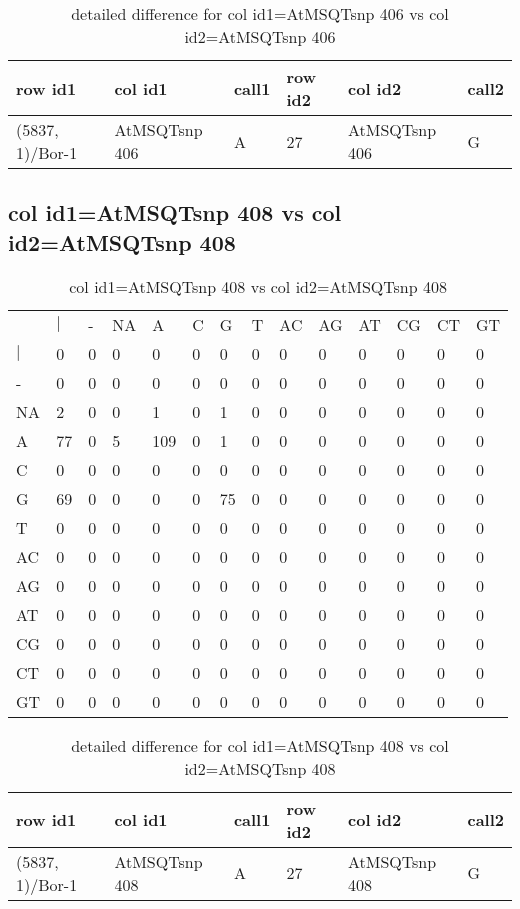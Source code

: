 \begin{center}
\begin{longtable}{|l|l|l|l|l|l|}
\caption{detailed difference for col id1=AtMSQTsnp 406 vs col id2=AtMSQTsnp 406} \label{table_dm917}\\
\hline
row id1&col id1&call1&row id2&col id2&call2\\
\hline
(5837, 1)/Bor-1&AtMSQTsnp 406&A&27&AtMSQTsnp 406&G\\
\hline
\end{longtable}
\end{center}

\subsection{col id1=AtMSQTsnp 408 vs col id2=AtMSQTsnp 408}
\begin{center}
\begin{longtable}{|l|l|l|l|l|l|l|l|l|l|l|l|l|l|}
\caption{col id1=AtMSQTsnp 408 vs col id2=AtMSQTsnp 408} \label{table_dm918}\\
\hline
\\
\hline
&$|$&-&NA&A&C&G&T&AC&AG&AT&CG&CT&GT\\
$|$&0&0&0&0&0&0&0&0&0&0&0&0&0\\
-&0&0&0&0&0&0&0&0&0&0&0&0&0\\
NA&2&0&0&1&0&1&0&0&0&0&0&0&0\\
A&77&0&5&109&0&1&0&0&0&0&0&0&0\\
C&0&0&0&0&0&0&0&0&0&0&0&0&0\\
G&69&0&0&0&0&75&0&0&0&0&0&0&0\\
T&0&0&0&0&0&0&0&0&0&0&0&0&0\\
AC&0&0&0&0&0&0&0&0&0&0&0&0&0\\
AG&0&0&0&0&0&0&0&0&0&0&0&0&0\\
AT&0&0&0&0&0&0&0&0&0&0&0&0&0\\
CG&0&0&0&0&0&0&0&0&0&0&0&0&0\\
CT&0&0&0&0&0&0&0&0&0&0&0&0&0\\
GT&0&0&0&0&0&0&0&0&0&0&0&0&0\\
\hline
\end{longtable}
\end{center}

\begin{center}
\begin{longtable}{|l|l|l|l|l|l|}
\caption{detailed difference for col id1=AtMSQTsnp 408 vs col id2=AtMSQTsnp 408} \label{table_dm919}\\
\hline
row id1&col id1&call1&row id2&col id2&call2\\
\hline
(5837, 1)/Bor-1&AtMSQTsnp 408&A&27&AtMSQTsnp 408&G\\
\hline
\end{longtable}
\end{center}

